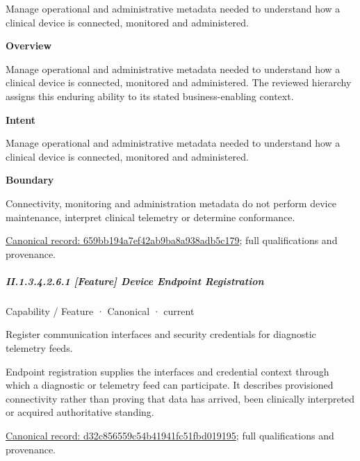 Manage operational and administrative metadata needed to understand how a clinical device is connected, monitored and administered.



\textbf{Overview}



Manage operational and administrative metadata needed to understand how a clinical device is connected, monitored and administered. The reviewed hierarchy assigns this enduring ability to its stated business-enabling context.



\textbf{Intent}



Manage operational and administrative metadata needed to understand how a clinical device is connected, monitored and administered.



\textbf{Boundary}



Connectivity, monitoring and administration metadata do not perform device maintenance, interpret clinical telemetry or determine conformance.


{\footnotesize \href{../../../../continuum/strategy/capability/659bb194a7ef42ab9ba8a938adb5c179.md}{Canonical record: 659bb194a7ef42ab9ba8a938adb5c179}; full qualifications and provenance.}\par
\subparagraph*{II.1.3.4.2.6.1 [Feature] Device Endpoint Registration}
\label{navigation:II.1.3.4.2.6.1}

\label{element:d32c856559c54b41941fc51fbd019195}
{\small Capability / Feature · Canonical · current}\par

Register communication interfaces and security credentials for diagnostic telemetry feeds.



Endpoint registration supplies the interfaces and credential context through which a diagnostic or telemetry feed can participate. It describes provisioned connectivity rather than proving that data has arrived, been clinically interpreted or acquired authoritative standing.


{\footnotesize \href{../../../../continuum/strategy/capability/feature/d32c856559c54b41941fc51fbd019195.md}{Canonical record: d32c856559c54b41941fc51fbd019195}; full qualifications and provenance.}\par
